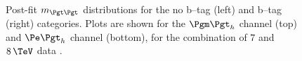 \begin{figure}[tbh]

\caption[Post-fit $m_{\Pgt\Pgt}$ distributions for the no b--tag
and b--tag categories.]{Post-fit $m_{\Pgt\Pgt}$ distributions for the no b--tag
(left) and b--tag (right) categories. Plots are shown for
the $\mutau$ channel (top) and $\etau$ channel (bottom), for the combination of
$7$ and $8\,\TeV$ data \cite{HIG-13-021}.}
\label{fig:mssmpostfitmass}
\end{figure}

